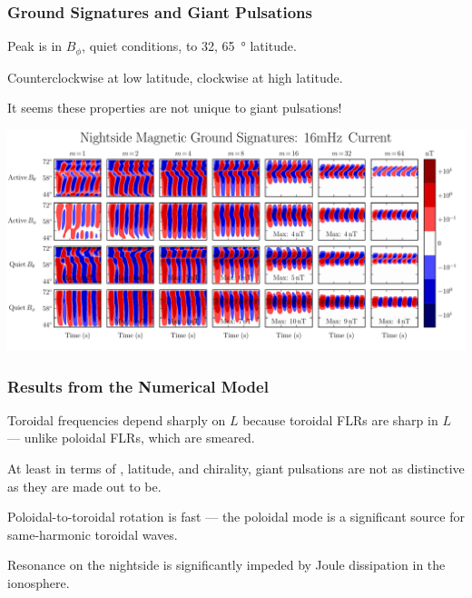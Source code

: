 \documentclass{beamer}
\begin{document}
\begin{frame}
\frametitle{Ground Signatures and Giant Pulsations}

\begin{wideitemize}
\item Peak is in $B_\phi$, quiet conditions,  to 32, \about\SI{65}{\degree} latitude. 
\item Counterclockwise at low latitude, clockwise at high latitude. 
\item It seems these properties are not unique to giant pulsations! 
\end{wideitemize}

\vfill

\includegraphics[width=\textwidth]{figures/ground_night.pdf}%

\end{frame}


\begin{frame}
\frametitle{Results from the Numerical Model}

\begin{wideitemize}
\item Toroidal frequencies depend sharply on $L$ because toroidal FLRs are sharp in $L$ --- unlike poloidal FLRs, which are smeared. 
\item At least in terms of \azm, latitude, and chirality, giant pulsations are not as distinctive as they are made out to be. 
\item Poloidal-to-toroidal rotation is fast --- the poloidal mode is a significant source for same-harmonic toroidal waves. 
\item Resonance on the nightside is significantly impeded by Joule dissipation in the ionosphere.  
\end{wideitemize}

\end{frame}
\end{document}
